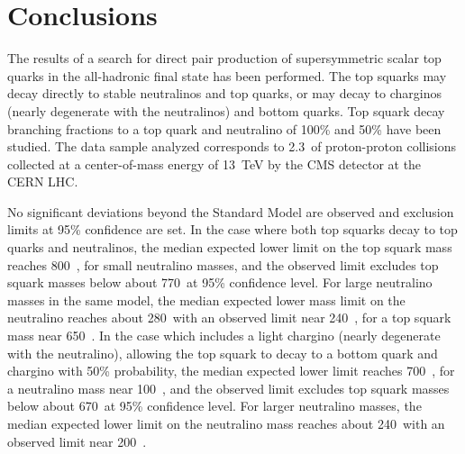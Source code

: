 \section{Conclusions}

The results of a search for direct pair production of supersymmetric scalar top quarks in the all-hadronic final state has been performed.  
%
The top squarks may decay directly to stable neutralinos and top quarks, or may decay to charginos (nearly degenerate with the neutralinos) and bottom quarks.  
%
Top squark decay branching fractions to a top quark and neutralino of 100\% and 50\% have been studied.  
%
The data sample analyzed corresponds to 2.3~\fbinv of proton-proton collisions collected at a center-of-mass energy of 13~TeV by the CMS detector at the CERN LHC.  

No significant deviations beyond the Standard Model are observed and exclusion limits at 95\% confidence are set.  
%
In the case where both top squarks decay to top quarks and neutralinos, the median expected lower limit on the top squark mass reaches 800~\GeV, for small neutralino masses, and the observed limit excludes top squark masses below about 770~\GeV at 95\% confidence level.  
%
For large neutralino masses in the same model, the median expected lower mass limit on the neutralino reaches about 280~\GeV with an observed limit near 240~\GeV, for a top squark mass near 650~\GeV. 
%
In the case which includes a light chargino (nearly degenerate with the neutralino), allowing the top squark to decay to a bottom quark and chargino with 50\% probability, the median expected lower limit reaches 700~\GeV, for a neutralino mass near 100~\GeV, and the observed limit excludes top squark masses below about 670~\GeV at 95\% confidence level. 
%
For larger neutralino masses, the median expected lower limit on the neutralino mass reaches about 240~\GeV with an observed limit near 200~\GeV. 

